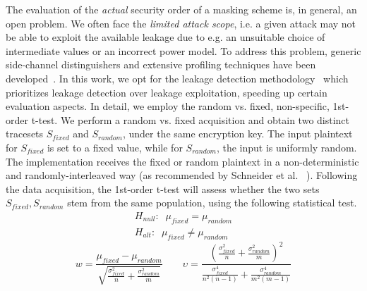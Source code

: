 The evaluation of the \emph{actual} security order of a masking scheme is, in general, an open problem. We often face the \emph{limited attack scope}, i.e. a given attack may not be able to exploit the available leakage due to e.g. an unsuitable choice of intermediate values or an incorrect power model. To address this problem, generic side-channel distinguishers and extensive profiling techniques have been developed~\cite{DBLP:journals/joc/BatinaGPRSV11,DBLP:conf/cardis/WhitnallOM11,DBLP:conf/eurocrypt/StandaertMY09}. In this work, we opt for the
leakage detection methodology~\cite{tvla} which prioritizes leakage detection over leakage exploitation, speeding up certain evaluation aspects. In detail, we employ the random vs. fixed, non-specific, 1st-order t-test. We perform a random vs. fixed acquisition and obtain two distinct tracesets $S_{fixed}$ and $S_{random}$, under the same encryption key. The input plaintext for $S_{fixed}$ is set to a fixed value, while for $S_{random}$, the input is uniformly random. The implementation receives the fixed or random plaintext in a non-deterministic and randomly-interleaved way (as recommended by Schneider et al. ~\cite{DBLP:conf/ches/SchneiderM15}). Following the data acquisition, the 1st-order t-test will assess whether the two sets $S_{fixed},S_{random}$ stem from the same population, using the following statistical test.
\begin{equation}
\begin{split}
H_{null}: \;\; \mu_{fixed} = \mu_{random} \\
H_{alt}: \;\; \mu_{fixed} \neq \mu_{random}
\end{split}
\end{equation}
\begin{equation}
w = \frac {\mu_{fixed} - \mu_{random}} {\sqrt{ \frac{\sigma_{fixed}^2}{n} + \frac{\sigma_{random}^2}   {m}  }  } \qquad \upsilon = \frac { (\frac{\sigma_{fixed}^2} {n}   + \frac{\sigma_{random}^2} {m}) ^2  } {\frac{\sigma_{fixed}^4} {n^2(n-1)} + \frac{\sigma_{random}^4} {m^2(m-1)}  }
\end{equation}




